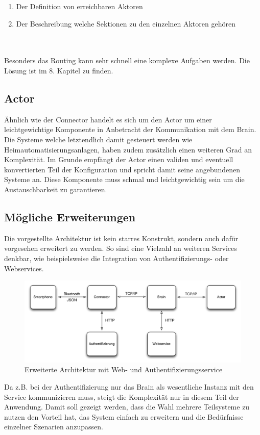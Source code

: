 \begin{enumerate}
     \item Der Definition von erreichbaren Aktoren
     \item Der Beschreibung welche Sektionen zu den einzelnen Aktoren gehören
   \end{enumerate}
\\\\
Besonders das Routing kann sehr schnell eine komplexe Aufgaben werden. Die Lösung ist im 8. Kapitel zu finden.

\subsection{Actor}
Ähnlich wie der Connector handelt es sich um den Actor um einer leichtgewichtige Komponente in Anbetracht der Kommunikation mit dem Brain. Die Systeme welche letztendlich damit gesteuert werden wie Heimautomatisierungsanlagen, haben zudem zusätzlich einen weiteren Grad an Komplexität. 
Im Grunde empfängt der Actor einen validen und eventuell konvertierten Teil der Konfiguration und spricht damit seine angebundenen Systeme an. Diese Komponente muss schmal und leichtgewichtig sein um die Austauschbarkeit zu garantieren.

\subsection{Mögliche Erweiterungen}
Die vorgestellte Architektur ist kein starres Konstrukt, sondern auch dafür vorgesehen erweitert zu werden. So sind eine Vielzahl an weiteren Services denkbar, wie beispielsweise die Integration von Authentifizierungs- oder Webservices. 

\begin{figure}[H]
\includegraphics[width=12.5cm]{images/extended_architecture}
\caption{Erweiterte Architektur mit Web- und Authentifizierungsservice}
\end{figure}

Da z.B. bei der Authentifizierung nur das Brain als wesentliche Instanz mit den Service kommunizieren muss, steigt die Komplexität nur in diesem Teil der Anwendung. Damit soll gezeigt werden, dass die Wahl mehrere Teilsysteme zu nutzen den Vorteil hat, das System einfach zu erweitern und die Bedürfnisse einzelner Szenarien anzupassen. 


